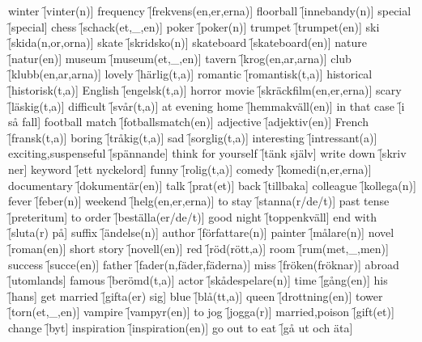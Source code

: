 \begin{questions}
\begin{multicols}{2}
        \question winter \f[vinter(n)]
        \question frequency \f[frekvens(en,er,erna)]
        \question floorball \f[innebandy(n)]
        \question special \f[special]
        \question chess \f[schack(et,\_,en)]
        \question poker \f[poker(n)]
        \question trumpet \f[trumpet(en)]
        \question ski \f[skida(n,or,orna)]
        \question skate \f[skridsko(n)]
        \question skateboard \f[skateboard(en)]
        \question nature \f[natur(en)]
        \question museum \f[museum(et,\_,en)]
        \question tavern \f[krog(en,ar,arna)]
        \question club \f[klubb(en,ar,arna)]
        \question lovely \f[härlig(t,a)]
        \question romantic \f[romantisk(t,a)]
        \question historical \f[historisk(t,a)]
        \question English \f[engelsk(t,a)]
        \question horror movie \f[skräckfilm(en,er,erna)]
        \question scary \f[läskig(t,a)]
        \question difficult \f[svår(t,a)]
        \question at evening home \f[hemmakväll(en)]
        \question in that case \f[i så fall]
        \question football match \f[fotballsmatch(en)]
        \question adjective \f[adjektiv(en)]
        \question French \f[fransk(t,a)]
        \question boring \f[tråkig(t,a)]
        \question sad \f[sorglig(t,a)]
        \question interesting \f[intressant(a)]
        \question exciting,suspenseful \f[spännande]
        \question think for yourself \f[tänk själv]
        \question write down \f[skriv ner]
        \question keyword \f[ett nyckelord]
        \question funny \f[rolig(t,a)]
        \question comedy \f[komedi(n,er,erna)]
        \question documentary \f[dokumentär(en)]
        \question talk \f[prat(et)]
        \question back \f[tillbaka]
        \question colleague \f[kollega(n)]
        \question fever \f[feber(n)]
        \question weekend \f[helg(en,er,erna)]
        \question to stay \f[stanna(r/de/t)]
        \question past tense \f[preteritum]
        \question to order \f[beställa(er/de/t)]
        \question good night \f[toppenkväll]
        \question end with \f[sluta(r) på]
        \question suffix \f[ändelse(n)]
        \question author \f[författare(n)]
        \question painter \f[målare(n)]
        \question novel \f[roman(en)]
        \question short story \f[novell(en)]
        \question red \f[röd(rött,a)]
        \question room \f[rum(met,\_,men)]
        \question success \f[succe(en)]
        \question father \f[fader(n,fäder,fäderna)]
        \question miss \f[fröken(fröknar)]
        \question abroad \f[utomlands]
        \question famous \f[berömd(t,a)]
        \question actor \f[skådespelare(n)]
        \question time \f[gång(en)]
        \question his \f[hans]
        \question get married \f[gifta(er) sig]
        \question blue \f[blå(tt,a)]
        \question queen \f[drottning(en)]
        \question tower \f[torn(et,\_,en)]
        \question vampire \f[vampyr(en)]
        \question to jog \f[jogga(r)]
        \question married,poison \f[gift(et)]
        \question change \f[byt]
        \question inspiration \f[inspiration(en)]
        \question go out to eat \f[gå ut och äta]
    \end{multicols}
\end{questions}
